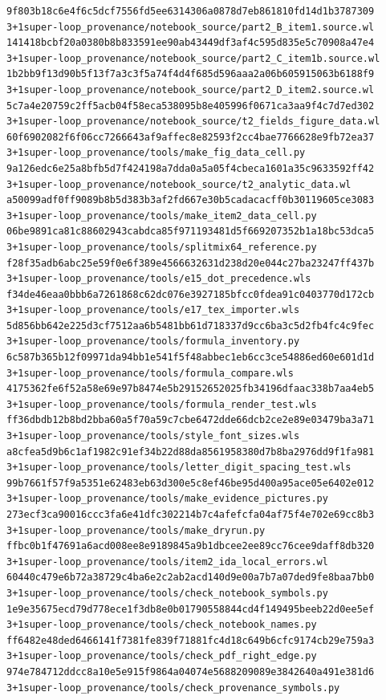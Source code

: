 \documentclass[
  10pt,
]{article}
\begin{document}
\begin{verbatim}
9f803b18c6e4f6c5dcf7556fd5ee6314306a0878d7eb861810fd14d1b3787309  3+1super-loop_provenance/notebook_source/part2_B_item1.source.wl
141418bcbf20a0380b8b833591ee90ab43449df3af4c595d835e5c70908a47e4  3+1super-loop_provenance/notebook_source/part2_C_item1b.source.wl
1b2bb9f13d90b5f13f7a3c3f5a74f4d4f685d596aaa2a06b605915063b6188f9  3+1super-loop_provenance/notebook_source/part2_D_item2.source.wl
5c7a4e20759c2ff5acb04f58eca538095b8e405996f0671ca3aa9f4c7d7ed302  3+1super-loop_provenance/notebook_source/t2_fields_figure_data.wl
60f6902082f6f06cc7266643af9affec8e82593f2cc4bae7766628e9fb72ea37  3+1super-loop_provenance/tools/make_fig_data_cell.py
9a126edc6e25a8bfb5d7f424198a7dda0a5a05f4cbeca1601a35c9633592ff42  3+1super-loop_provenance/notebook_source/t2_analytic_data.wl
a50099adf0ff9089b8b5d383b3af2fd667e30b5cadacacff0b30119605ce3083  3+1super-loop_provenance/tools/make_item2_data_cell.py
06be9891ca81c88602943cabdca85f971193481d5f669207352b1a18bc53dca5  3+1super-loop_provenance/tools/splitmix64_reference.py
f28f35adb6abc25e59f0e6f389e4566632631d238d20e044c27ba23247ff437b  3+1super-loop_provenance/tools/e15_dot_precedence.wls
f34de46eaa0bbb6a7261868c62dc076e3927185bfcc0fdea91c0403770d172cb  3+1super-loop_provenance/tools/e17_tex_importer.wls
5d856bb642e225d3cf7512aa6b5481bb61d718337d9cc6ba3c5d2fb4fc4c9fec  3+1super-loop_provenance/tools/formula_inventory.py
6c587b365b12f09971da94bb1e541f5f48abbec1eb6cc3ce54886ed60e601d1d  3+1super-loop_provenance/tools/formula_compare.wls
4175362fe6f52a58e69e97b8474e5b29152652025fb34196dfaac338b7aa4eb5  3+1super-loop_provenance/tools/formula_render_test.wls
ff36dbdb12b8bd2bba60a5f70a59c7cbe6472dde66dcb2ce2e89e03479ba3a71  3+1super-loop_provenance/tools/style_font_sizes.wls
a8cfea5d9b6c1af1982c91ef34b22d88da8561958380d7b8ba2976dd9f1fa981  3+1super-loop_provenance/tools/letter_digit_spacing_test.wls
99b7661f57f9a5351e62483eb63d300e5c8ef46be95d400a95ace05e6402e012  3+1super-loop_provenance/tools/make_evidence_pictures.py
273ecf3ca90016ccc3fa6e41dfc302214b7c4afefcfa04af75f4e702e69cc8b3  3+1super-loop_provenance/tools/make_dryrun.py
ffbc0b1f47691a6acd008ee8e9189845a9b1dbcee2ee89cc76cee9daff8db320  3+1super-loop_provenance/tools/item2_ida_local_errors.wl
60440c479e6b72a38729c4ba6e2c2ab2acd140d9e00a7b7a07ded9fe8baa7bb0  3+1super-loop_provenance/tools/check_notebook_symbols.py
1e9e35675ecd79d778ece1f3db8e0b01790558844cd4f149495beeb22d0ee5ef  3+1super-loop_provenance/tools/check_notebook_names.py
ff6482e48ded6466141f7381fe839f71881fc4d18c649b6cfc9174cb29e759a3  3+1super-loop_provenance/tools/check_pdf_right_edge.py
974e784712ddcc8a10e5e915f9864a04074e5688209089e3842640a491e381d6  3+1super-loop_provenance/tools/check_provenance_symbols.py

\end{verbatim}
\end{document}
